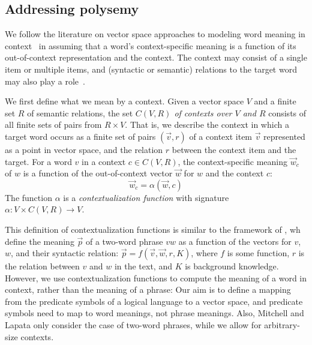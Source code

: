 \subsection*{Addressing polysemy}

We follow the literature on vector space approaches to modeling word
meaning in
context~\citep{erk:emnlp08,ThaterFuerstenauPinkal:10,ReisingerMooney:10,dinu-lapata:2010:EMNLP,vandecruys:emnlp2011}
in assuming that a word's context-specific meaning is a function of its
out-of-context representation and the context. The context may consist
of a single item or multiple items, and (syntactic or semantic) relations to the
target word may also play a
role~\citep{erk:emnlp08,ThaterFuerstenauPinkal:10,vandecruys:emnlp2011}. 

We
first define what we mean by a context. Given a vector space $V$ and a
finite set $R$ of semantic relations, the set
\textit{$C(V, R)$ of contexts over $V$ and $R$} consists of all finite sets of
pairs from $R \times V$.  That is, we describe the context in which a
target word occurs as a finite set of pairs $(\vec v, r)$ of a context
item $\vec v$ represented as a point in vector space, and the relation $r$
between the context item and the target. 
For a word $v$ in a context $c
\in C(V, R)$, the context-specific meaning $\vec w_c$ of $w$ is a
function of the out-of-context vector $\vec w$ for $w$ and the context
$c$:
\[\vec w_c = \alpha(\vec w, c)\]
The function $\alpha$ is a \emph{contextualization function} with
signature $\alpha: V \times C(V, R) \to V$. 

This definition of contextualization functions is similar to the
framework of \citet{MitchellLapata:08}, wh define the meaning $\vec p$
of a two-word phrase $vw$ as a function of the vectors for $v$, $w$, and their
syntactic relation: $\vec p = f(\vec v, \vec w, r, K)$,  where $f$ is some function, $r$ is the
relation between $v$ and $w$ in the text, and $K$ is background
knowledge. However, we use contextualization functions to compute the meaning of a word in
context, rather than the meaning of a phrase: Our aim is to define a
mapping from the predicate symbols of a logical language to a vector
space, and predicate symbols need to map to word meanings, not phrase
meanings. Also, Mitchell and Lapata only consider the case of two-word
phrases, while we allow for arbitrary-size contexts. 



